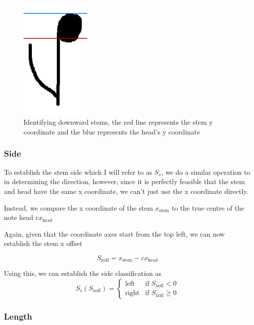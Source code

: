 \begin{figure}[h!]
    \quad
    \includegraphics[height=6cm]{gfx/techniques/scoring/note-stem-down/6090.png}

    \caption{Identifying downward stems, the red line represents the stem y  coordinate and the blue represents the head's y coordinate}
    \label{fig:downward-stem-identification}
\end{figure}

\subsubsection{Side}\label{sec:scoring-stem-side}
To establish the stem side which I will refer to as $S_s$, we do a similar operation to in determining the direction, however, since it is perfectly feasible that the stem and head have the same x coordinate, we can't just use the x coordinate directly.

Instead, we compare the x coordinate of the stem $x_{\text{stem}}$ to the true centre  of the note head $cx_{\text{head}}$

Again, given that the coordinate axes start from the top left, we can now establish the stem x offset

$$
S_\text{xoff} = x_{\text{stem}} - cx_{\text{head}}
$$

Using this, we can establish the side classification as
$$
S_{s} (S_\text{xoff}) =
\left\{
    \begin{array}{ll}
        \text{left}   & \mbox{if } S_\text{xoff} < 0 \\
        \text{right}  & \mbox{if } S_\text{xoff} \ge 0
    \end{array}
\right.
$$

\subsubsection{Length}\label{sec:scoring-stem-length}


